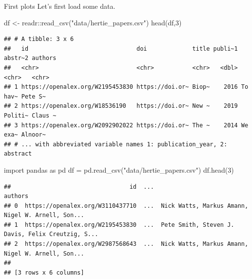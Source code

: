 \documentclass[
  10pt,
  ignorenonframetext,
  aspectratio=169]{beamer}
\newenvironment{Shaded}{\begin{snugshade}}{\end{snugshade}}
\newcommand{\DecValTok}[1]{\textcolor[rgb]{0.86,0.86,0.80}{#1}}
\newcommand{\FunctionTok}[1]{\textcolor[rgb]{0.94,0.94,0.56}{#1}}
\newcommand{\ImportTok}[1]{\textcolor[rgb]{0.80,0.80,0.80}{#1}}
\newcommand{\NormalTok}[1]{\textcolor[rgb]{0.80,0.80,0.80}{#1}}
\newcommand{\OperatorTok}[1]{\textcolor[rgb]{0.94,0.94,0.82}{#1}}
\newcommand{\OtherTok}[1]{\textcolor[rgb]{0.94,0.94,0.56}{#1}}
\newcommand{\SpecialCharTok}[1]{\textcolor[rgb]{0.86,0.64,0.64}{#1}}
\newcommand{\StringTok}[1]{\textcolor[rgb]{0.80,0.58,0.58}{#1}}
\begin{document}
\begin{frame}[fragile]{First plots}
\protect\hypertarget{first-plots}{}
Let's first load some data.

\scriptsize

\begin{Shaded}
\begin{Highlighting}[]
\NormalTok{df }\OtherTok{\textless{}{-}}\NormalTok{ readr}\SpecialCharTok{::}\FunctionTok{read\_csv}\NormalTok{(}\StringTok{"data/hertie\_papers.csv"}\NormalTok{)}
\FunctionTok{head}\NormalTok{(df,}\DecValTok{3}\NormalTok{)}
\end{Highlighting}
\end{Shaded}

\begin{verbatim}
## # A tibble: 3 x 6
##   id                               doi             title publi~1 abstr~2 authors
##   <chr>                            <chr>           <chr>   <dbl> <chr>   <chr>  
## 1 https://openalex.org/W2195453830 https://doi.or~ Biop~    2016 To hav~ Pete S~
## 2 https://openalex.org/W18536190   https://doi.or~ New ~    2019 Politi~ Claus ~
## 3 https://openalex.org/W2092902022 https://doi.or~ The ~    2014 We exa~ Alnoor~
## # ... with abbreviated variable names 1: publication_year, 2: abstract
\end{verbatim}

\begin{Shaded}
\begin{Highlighting}[]
\ImportTok{import}\NormalTok{ pandas }\ImportTok{as}\NormalTok{ pd}
\NormalTok{df }\OperatorTok{=}\NormalTok{ pd.read\_csv(}\StringTok{"data/hertie\_papers.csv"}\NormalTok{)}
\NormalTok{df.head(}\DecValTok{3}\NormalTok{)}
\end{Highlighting}
\end{Shaded}

\begin{verbatim}
##                                  id  ...                                            authors
## 0  https://openalex.org/W3110437710  ...  Nick Watts, Markus Amann, Nigel W. Arnell, Son...
## 1  https://openalex.org/W2195453830  ...  Pete Smith, Steven J. Davis, Felix Creutzig, S...
## 2  https://openalex.org/W2987568643  ...  Nick Watts, Markus Amann, Nigel W. Arnell, Son...
## 
## [3 rows x 6 columns]
\end{verbatim}
\end{frame}
\end{document}
